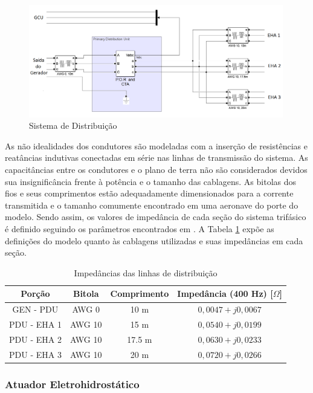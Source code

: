 \begin{figure}[!htb] %
	\centering
	\includegraphics[width=0.99\textwidth]{Cap4/Figuras/dist.png}
	\caption{Sistema de Distribuição}
	\label{fig:dist.png}
\end{figure}

As não idealidades dos condutores são modeladas com a inserção de resistências e reatâncias indutivas conectadas em série nas linhas de transmissão do sistema. As capacitâncias entre os condutores e o plano de terra não são considerados devidos sua insignificância frente à potência e o tamanho das cablagens. As bitolas dos fios e seus comprimentos estão adequadamente dimensionados para a corrente transmitida e o tamanho comumente encontrado em uma aeronave do porte do modelo. Sendo assim, os valores de impedância de cada seção do sistema trifásico é definido seguindo os parâmetros encontrados em \cite{Exner1953}. A Tabela \ref{tab:Zdist} expõe as definições do modelo quanto às cablagens utilizadas e suas impedâncias em cada seção. 

\begin{table}[!htb]
	\centering
	\begin{tabular}{|c|c|c|c|}
		\hline
		\textbf{Porção}		&	\textbf{Bitola}		&	\textbf{Comprimento}	&	\textbf{Impedância (400 Hz) [$\Omega$]}	\\\hline
		GEN - PDU	&	AWG 0		&	10 m		&	$0,0047+j0,0067$	\\\hline
		PDU - EHA 1	&	AWG 10 		&	15 m		&	$0,0540+j0,0199$	\\\hline
		PDU - EHA 2 	&	AWG 10		&	17.5 m 		&	$0,0630+j0,0233$	\\\hline
		PDU - EHA 3	&	AWG 10		&	20 m 		&	$0,0720+j0,0266$	\\\hline
	\end{tabular}
	\caption{Impedâncias das linhas de distribuição}
	\label{tab:Zdist}
\end{table}

\subsubsection{Atuador Eletrohidrostático}

